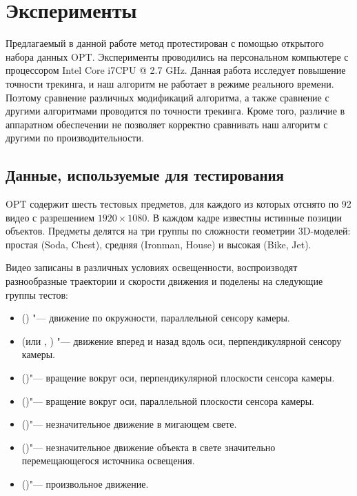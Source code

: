 \section{Эксперименты}\label{experiments}

Предлагаемый в данной работе метод протестирован с помощью открытого набора
данных OPT\cite{OPT}.
Эксперименты проводились на персональном компьютере с процессором Intel Core
i7CPU @ 2.7 GHz.
Данная работа исследует повышение точности трекинга, и наш алгоритм не работает
в режиме реального времени.
Поэтому сравнение различных модификаций алгоритма, а также сравнение с другими
алгоритмами проводится по точности трекинга.
Кроме того, различие в аппаратном обеспечении не позволяет корректно сравнивать
наш алгоритм с другими по производительности.

\subsection{Данные, используемые для тестирования}

OPT содержит шесть тестовых предметов, для каждого из которых отснято
по 92 видео с разрешением $1920\times1080$.
В каждом кадре известны истинные позиции объектов.
Предметы делятся на три группы по сложности геометрии 3D-моделей: простая
(Soda, Chest), средняя (Ironman, House) и высокая (Bike, Jet).

Видео записаны в различных условиях освещенности, воспроизводят разнообразные
траектории и скорости движения и поделены на следующие группы тестов:
\begin{itemize}
\item {} () "--- движение по окружности,
параллельной
        сенсору камеры.
\item {} (или , ) "--- движение вперед
и
        назад вдоль оси, перпендикулярной сенсору камеры.
\item {} ()"--- вращение вокруг оси,
перпендикулярной
        плоскости сенсора камеры.
\item {} ()"--- вращение вокруг оси,
параллельной
        плоскости сенсора камеры.
\item {} ()"--- незначительное движение в мигающем
свете.
\item {} ()"--- незначительное движение объекта в
свете значительно
        перемещающегося источника освещения.
    \item {} ()"--- произвольное движение.
\end{itemize}

